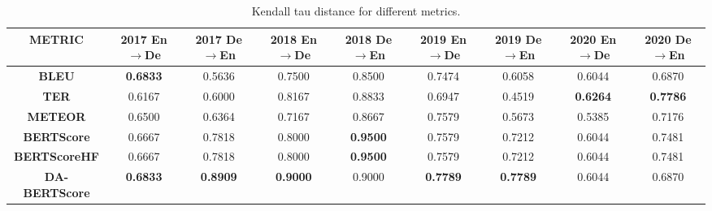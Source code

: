 \begin{table*}[ht]
\centering
\tiny
\begin{tabular}{ccccccccc}
\toprule
\textbf{METRIC} & \textbf{2017 En$\rightarrow$De} & \textbf{2017 De$\rightarrow$En} & \textbf{2018 En$\rightarrow$De} & \textbf{2018 De$\rightarrow$En} & \textbf{2019 En$\rightarrow$De} & \textbf{2019 De$\rightarrow$En} & \textbf{2020 En$\rightarrow$De} & \textbf{2020 De$\rightarrow$En} \\
\midrule
\textbf{BLEU } & \textbf{0.6833} & {0.5636} & {0.7500} & {0.8500} & {0.7474} & {0.6058} & {0.6044} & {0.6870} \\
\textbf{TER } & {0.6167} & {0.6000} & {0.8167} & {0.8833} & {0.6947} & {0.4519} & \textbf{0.6264} & \textbf{0.7786} \\
\textbf{METEOR } & {0.6500} & {0.6364} & {0.7167} & {0.8667} & {0.7579} & {0.5673} & {0.5385} & {0.7176} \\
\textbf{BERTScore } & {0.6667} & {0.7818} & {0.8000} & \textbf{0.9500} & {0.7579} & {0.7212} & {0.6044} & {0.7481} \\
\textbf{BERTScoreHF } & {0.6667} & {0.7818} & {0.8000} & \textbf{0.9500} & {0.7579} & {0.7212} & {0.6044} & {0.7481} \\
\textbf{DA-BERTScore } & \textbf{0.6833} & \textbf{0.8909} & \textbf{0.9000} & {0.9000} & \textbf{0.7789} & \textbf{0.7789} & {0.6044} & {0.6870} \\
\bottomrule
\end{tabular}
\caption{\label{tab:table1_tau}Kendall tau distance for different metrics.}
\end{table*}